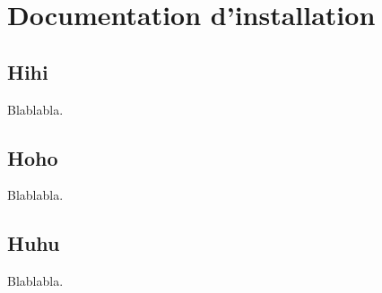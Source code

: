 \newpage

\chapter{Documentation d'installation}

\section{Hihi}

Blablabla.

\section{Hoho}

Blablabla.

\section{Huhu}

Blablabla.